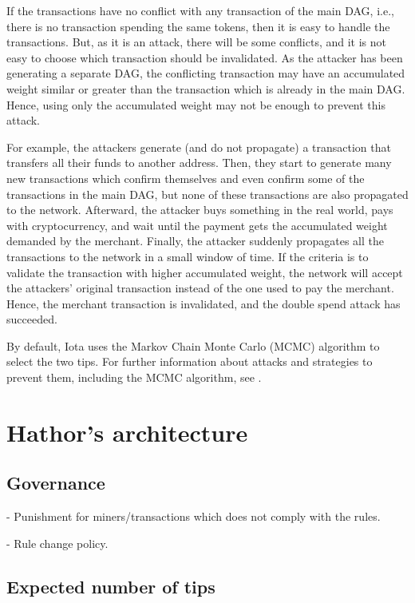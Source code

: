 If the transactions have no conflict with any transaction of the main DAG, i.e., there is no transaction spending the same tokens, then it is easy to handle the transactions. But, as it is an attack, there will be some conflicts, and it is not easy to choose which transaction should be invalidated. As the attacker has been generating a separate DAG, the conflicting transaction may have an accumulated weight similar or greater than the transaction which is already in the main DAG. Hence, using only the accumulated weight may not be enough to prevent this attack.

For example, the attackers generate (and do not propagate) a transaction that transfers all their funds to another address. Then, they start to generate many new transactions which confirm themselves and even confirm some of the transactions in the main DAG, but none of these transactions are also propagated to the network. Afterward, the attacker buys something in the real world, pays with cryptocurrency, and wait until the payment gets the accumulated weight demanded by the merchant. Finally, the attacker suddenly propagates all the transactions to the network in a small window of time. If the criteria is to validate the transaction with higher accumulated weight, the network will accept the attackers' original transaction instead of the one used to pay the merchant. Hence, the merchant transaction is invalidated, and the double spend attack has succeeded.

By default, Iota uses the Markov Chain Monte Carlo (MCMC) algorithm to select the two tips. For further information about attacks and strategies to prevent them, including the MCMC algorithm, see \cite{tangle2016}.


\chapter{Hathor's architecture}


\section{Governance}

- Punishment for miners/transactions which does not comply with the rules.

- Rule change policy.


\section{Expected number of tips}

